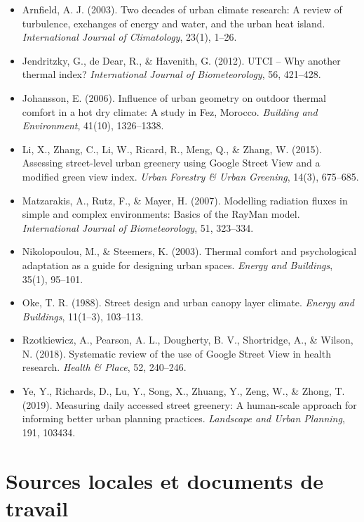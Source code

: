 \documentclass[11pt,a4paper]{report}
\begin{document}
\begin{itemize}
  \item Arnfield, A. J. (2003). Two decades of urban climate research: A review of turbulence, exchanges of energy and water, and the urban heat island. \emph{International Journal of Climatology}, 23(1), 1--26.
  \item Jendritzky, G., de Dear, R., \& Havenith, G. (2012). UTCI -- Why another thermal index? \emph{International Journal of Biometeorology}, 56, 421--428.
  \item Johansson, E. (2006). Influence of urban geometry on outdoor thermal comfort in a hot dry climate: A study in Fez, Morocco. \emph{Building and Environment}, 41(10), 1326--1338.
  \item Li, X., Zhang, C., Li, W., Ricard, R., Meng, Q., \& Zhang, W. (2015). Assessing street-level urban greenery using Google Street View and a modified green view index. \emph{Urban Forestry \& Urban Greening}, 14(3), 675--685.
  \item Matzarakis, A., Rutz, F., \& Mayer, H. (2007). Modelling radiation fluxes in simple and complex environments: Basics of the RayMan model. \emph{International Journal of Biometeorology}, 51, 323--334.
  \item Nikolopoulou, M., \& Steemers, K. (2003). Thermal comfort and psychological adaptation as a guide for designing urban spaces. \emph{Energy and Buildings}, 35(1), 95--101.
  \item Oke, T. R. (1988). Street design and urban canopy layer climate. \emph{Energy and Buildings}, 11(1--3), 103--113.
  \item Rzotkiewicz, A., Pearson, A. L., Dougherty, B. V., Shortridge, A., \& Wilson, N. (2018). Systematic review of the use of Google Street View in health research. \emph{Health \& Place}, 52, 240--246.
  \item Ye, Y., Richards, D., Lu, Y., Song, X., Zhuang, Y., Zeng, W., \& Zhong, T. (2019). Measuring daily accessed street greenery: A human-scale approach for informing better urban planning practices. \emph{Landscape and Urban Planning}, 191, 103434.
\end{itemize}

\section*{Sources locales et documents de travail}
\end{document}

